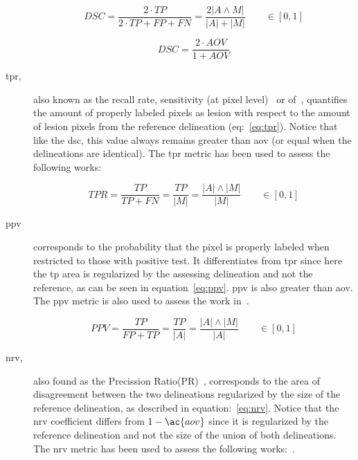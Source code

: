 \begin{description}
\begin{equation}\label{eq:dsc}
DSC=\frac{2 \cdot TP}{2 \cdot TP + FP + FN}=\frac{2 | A \wedge M |}{|A| + |M|} \qquad \in [0,1]
\end{equation}

\begin{equation}\label{eq:dsc2jsc}
DSC=\frac{2 \cdot AOV}{1+AOV}
\end{equation}

\item[\acf{tpr},]
also known as the recall rate, sensitivity (at pixel level)~\cite{gerard2013,Jiang:2012p14354} or \ac{of}~\cite{Huang:2007p6100}, quantifies the amount of properly labeled pixels as lesion with respect to the amount of lesion pixels from the reference delineation (eq:~\ref{eq:tpr}). Notice that like the \ac{dsc}, this value always remains greater than \ac{aov} (or equal when the delineations are identical). The \ac{tpr} metric has been used to assess the following works:~\cite{Madabhushi:2003p6036,Huang:2007p6100,Shan:2012p14347,Jiang:2012p14354,Huang:2005p11636,Huang:2012p14313,Liu:2010p14328,Yeh:2009p11985}


\begin{equation}\label{eq:tpr}
TPR = \frac{TP}{TP+FN}= \frac{TP}{|M|} = \frac{|A| \wedge |M|}{|M|} \qquad \in [0,1]
\end{equation}

\item[\acf{ppv}]
corresponds to the probability that the pixel is properly labeled when restricted to those with positive test. It differentiates from \ac{tpr} since here the \ac{tp} area is regularized by the assessing delineation and not the reference, as can be seen in equation~\ref{eq:ppv}. \ac{ppv} is also greater than \ac{aov}. The \ac{ppv} metric is also used to assess the work in~\cite{gerard2013}.

\begin{equation}\label{eq:ppv}
PPV= \frac{TP}{FP+TP} = \frac{TP}{|A|}=\frac{|A| \wedge |M|}{|A|} \qquad \in [0,1]
\end{equation}


\item[\acf{nrv},]
also found as the Precission Ratio(PR)~\cite{Huang:2004p2092}, corresponds to the area of disagreement between the two delineations regularized by the size of the reference delineation, as described in equation:~\ref{eq:nrv}. Notice that the \ac{nrv} coefficient differs from $1-\ac{aov}$ since it is regularized by the reference delineation and not the size of the union of both delineations.
The \ac{nrv} metric has been used to assess the following works:~\cite{Gomez:2010p14339,Liu:2005p14341,Huang:2004p2092}.



\end{description}
